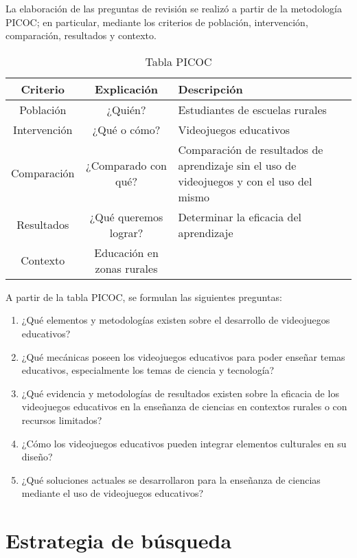 La elaboración de las preguntas de revisión se realizó a partir de la metodología PICOC; en particular, mediante los criterios de población, intervención, comparación, resultados y contexto.

\begin{table}[H]
    \centering
    \begin{tabularx}{\textwidth}{|c|c|X|}
        \hline
        Criterio & Explicación & Descripción \\ \hline
        Población & ¿Quién? & Estudiantes de escuelas rurales \\ \hline
        Intervención & ¿Qué o cómo? & Videojuegos educativos \\ \hline
        Comparación & ¿Comparado con qué? & Comparación de resultados de aprendizaje sin el uso de videojuegos y con el uso del mismo \\ \hline
        Resultados & ¿Qué queremos lograr? & Determinar la eficacia del aprendizaje \\ \hline
        Contexto & Educación en zonas rurales &  \\ \hline
    \end{tabularx}
    \caption{Tabla PICOC}
    \label{tab:placeholder}
\end{table}

A partir de la tabla PICOC, se formulan las siguientes preguntas:

\begin{enumerate}
    \item ¿Qué elementos y metodologías existen sobre el desarrollo de videojuegos educativos?
    \item ¿Qué mecánicas poseen los videojuegos educativos para poder enseñar temas educativos, especialmente los temas de ciencia y tecnología?
    \item ¿Qué evidencia y metodologías de resultados existen sobre la eficacia de los videojuegos educativos en la enseñanza de ciencias en contextos rurales o con recursos limitados?
    \item ¿Cómo los videojuegos educativos pueden integrar elementos culturales en su diseño?
    \item ¿Qué soluciones actuales se desarrollaron para la enseñanza de ciencias mediante el uso de videojuegos educativos?
\end{enumerate}

\section{Estrategia de búsqueda}

